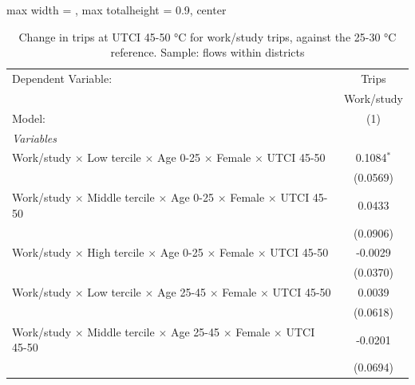 
\begin{table}[htbp]
   \caption{\label{table_intersectionality_work_or_study_45-50} Change in trips at UTCI 45-50 °C for work/study trips, against the 25-30 °C reference. Sample: flows within districts}
   \centering
   \small
   \begin{adjustbox}{max width = \textwidth, max totalheight = 0.9\textheight, center}
      \begin{tabular}{lc}
         \tabularnewline \midrule \midrule
         Dependent Variable:                                                                            & Trips\\  
                                                                                                        & Work/study \\   
         Model:                                                                                         & (1)\\  
         \midrule
         \emph{Variables}\\
         Work/study $\times$ Low tercile $\times$ Age 0-25 $\times$ Female $\times$ UTCI 45-50          & 0.1084$^{*}$\\   
                                                                                                        & (0.0569)\\   
         Work/study $\times$ Middle tercile $\times$ Age 0-25 $\times$ Female $\times$ UTCI 45-50       & 0.0433\\   
                                                                                                        & (0.0906)\\   
         Work/study $\times$ High tercile $\times$ Age 0-25 $\times$ Female $\times$ UTCI 45-50         & -0.0029\\   
                                                                                                        & (0.0370)\\   
         Work/study $\times$ Low tercile $\times$ Age 25-45 $\times$ Female $\times$ UTCI 45-50         & 0.0039\\   
                                                                                                        & (0.0618)\\   
         Work/study $\times$ Middle tercile $\times$ Age 25-45 $\times$ Female $\times$ UTCI 45-50      & -0.0201\\   
                                                                                                        & (0.0694)\\   

\end{tabular}
\end{adjustbox}
\end{table}
